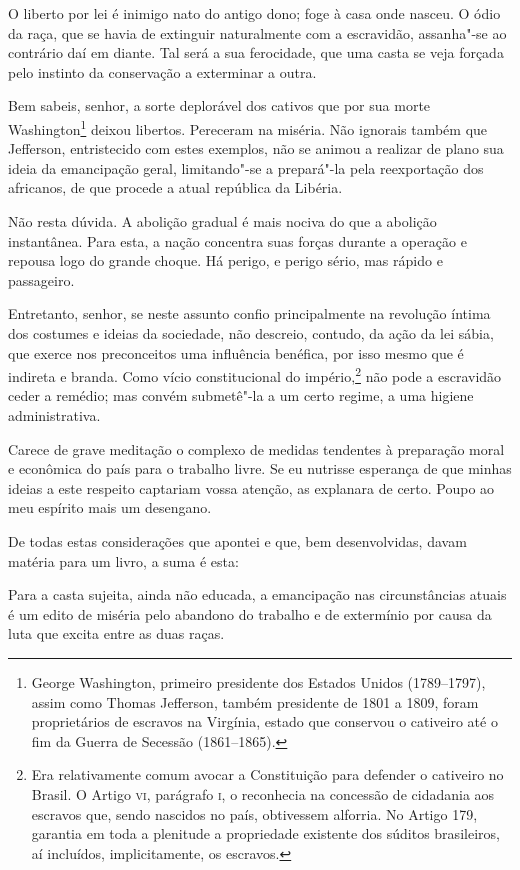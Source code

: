 \begin{linenumbers}
 O liberto por lei é inimigo nato do antigo dono; foge à casa onde
nasceu. O ódio da raça, que se havia de extinguir naturalmente com a
escravidão, assanha"-se ao contrário daí em diante. Tal será a sua
ferocidade, que uma casta se veja forçada pelo instinto da conservação
a exterminar a outra.

 Bem sabeis, senhor, a sorte deplorável dos cativos que por sua morte
Washington\footnote{ George Washington, primeiro presidente dos Estados Unidos
(1789--1797), assim como Thomas Jefferson, também presidente de 1801 a 1809, 
foram proprietários de escravos na Virgínia, estado que conservou o 
cativeiro até o fim da Guerra de Secessão (1861--1865).} deixou libertos. 
Pereceram na miséria. Não ignorais também que
Jefferson, entristecido com estes exemplos, não se animou a realizar de
plano sua ideia da emancipação geral, limitando"-se a prepará"-la
pela reexportação dos africanos, de que procede a atual república da Libéria.

 Não resta dúvida. A abolição gradual é mais nociva do que a abolição
instantânea. Para esta, a nação concentra suas forças durante a
operação e repousa logo do grande choque. Há perigo, e perigo sério, mas rápido e passageiro.

 Entretanto, senhor, se neste assunto confio principalmente na revolução
íntima dos costumes e ideias da sociedade, não descreio, contudo, da
ação da lei sábia, que exerce nos preconceitos uma influência benéfica,
por isso mesmo que é indireta e branda. Como vício constitucional do
império,\footnote{ Era relativamente comum avocar a Constituição para defender 
o cativeiro no Brasil. O Artigo \textsc{vi}, parágrafo \textsc{i}, o reconhecia na concessão de cidadania 
aos escravos que, sendo nascidos no país, obtivessem alforria. No Artigo 179, garantia 
em toda a plenitude a propriedade existente dos súditos brasileiros, aí incluídos, 
implicitamente, os escravos.} não pode a escravidão ceder a remédio; mas convém submetê"-la a um
certo regime, a uma higiene administrativa.

 Carece de grave meditação o complexo de medidas tendentes à preparação
moral e econômica do país para o trabalho livre. Se eu nutrisse
esperança de que minhas ideias a este respeito captariam vossa atenção,
as explanara de certo. Poupo ao meu espírito mais um desengano. 

 De todas estas considerações que apontei e que, bem desenvolvidas,
davam matéria para um livro, a suma é esta:

 Para a casta sujeita, ainda não educada, a emancipação nas
circunstâncias atuais é um edito de miséria pelo abandono do trabalho e
de extermínio por causa da luta que excita entre as duas raças.


\end{linenumbers}
